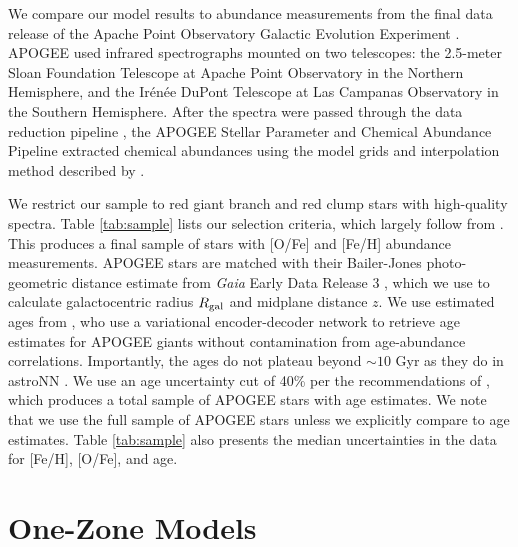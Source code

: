 \documentclass[twocolumn,twocolappendix,linenumbers,trackchanges]{aastex631}
\begin{document}
We compare our model results to abundance measurements from the final data release \citep[DR17;][]{Abdurro'uf2022-SDSSIV-DR17} of the Apache Point Observatory Galactic Evolution Experiment \citep[APOGEE;][]{Majewski2017-APOGEE}. APOGEE used infrared spectrographs \citep{Wilson2019-APOGEE-Spectrographs} mounted on two telescopes: the 2.5-meter Sloan Foundation Telescope \citep{Gunn2006-SloanTelescope} at Apache Point Observatory in the Northern Hemisphere, and the Ir{\'e}n{\'e}e DuPont Telescope \citep{BowenVaughan1973-DuPontTelescope} at Las Campanas Observatory in the Southern Hemisphere. After the spectra were passed through the data reduction pipeline \citep{Nidever2015-APOGEE-DataReduction}, the APOGEE Stellar Parameter and Chemical Abundance Pipeline \citep[ASPCAP;][]{Holtzmann2015-ASPCAP,GarciaPerez2016-ASPCAP} extracted chemical abundances using the model grids and interpolation method described by \citet{Jonsson2020-APOGEE-DR16}.

We restrict our sample to red giant branch and red clump stars with high-quality spectra. Table \ref{tab:sample} lists our selection criteria, which largely follow from \citet{Hayden2015-ChemicalCartography}. This produces a final sample of stars with [O/Fe] and [Fe/H] abundance measurements. APOGEE stars are matched with their Bailer-Jones photo-geometric distance estimate from \textit{Gaia} Early Data Release 3 \citep{Gaia2016-Mission,Gaia2021-EDR3}, which we use to calculate galactocentric radius $R_{\rm gal}$ and midplane distance $z$.
We use estimated ages from \citet[][hereafter ]{Leung2023-Ages}, who use a variational encoder-decoder network to retrieve age estimates for APOGEE giants without contamination from age-abundance correlations. Importantly, the  ages do not plateau beyond $\sim10$ Gyr as they do in astroNN \citep{Mackereth2019-astroNN-Ages}. We use an age uncertainty cut of 40\% per the recommendations of , which produces a total sample of APOGEE stars with age estimates. We note that we use the full sample of APOGEE stars unless we explicitly compare to age estimates. Table \ref{tab:sample} also presents the median uncertainties in the data for [Fe/H], [O/Fe], and age.

\section{One-Zone Models}
\label{sec:onezone-results}
\end{document}
